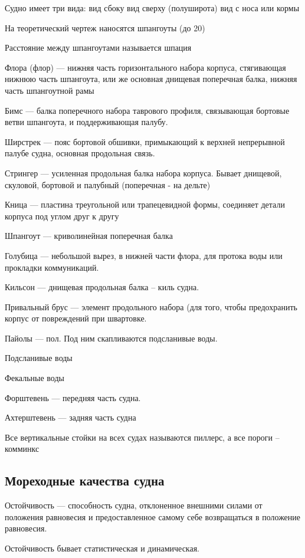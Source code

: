 \documentclass{article}        %
\begin{document}
\begin{description}
Судно имеет три вида:
вид сбоку
вид сверху (полуширота)
вид с носа или кормы

На теоретический чертеж наносятся шпангоуты
(до 20)

Расстояние между шпангоутами называется шпация


Флора (флор) --- нижняя часть горизонтального набора корпуса, 
	стягивающая нижнюю часть шпангоута, или же основная
	днищевая поперечная балка, нижняя часть шпангоутной рамы

Бимс --- балка поперечного набора таврового профиля, связывающая 
	бортовые ветви шпангоута, и поддерживающая палубу.


Ширстрек --- пояс бортовой обшивки, примыкающий к верхней непрерывной 
	палубе судна, основная продольная связь.

Стрингер --- усиленная продольная балка набора корпуса. Бывает
	днищевой, скуловой, бортовой и палубный (поперечная - на дельте)

Кница --- пластина треугольной или трапецевидной формы, соединяет детали корпуса под углом друг к другу

Шпангоут --- криволинейная поперечная балка

Голубица --- небольшой вырез, в нижней части флора, для протока воды или прокладки коммуникаций.

Кильсон --- днищевая продольная балка -- киль судна.

Привальный брус --- элемент продольного набора (для того, чтобы предохранить корпус от повреждений
	при швартовке. 

Пайолы --- пол. Под ним скапливаются подсланивые воды.

Подсланивые воды

Фекальные воды

Форштевень --- передняя часть судна.

Ахтерштевень --- задняя часть судна

Все вертикальные стойки на всех судах называются пиллерс, а все пороги -- комминкс




\subsection{Мореходные качества судна}
Остойчивость --- способность судна, отклоненное внешними силами от положения равновесия
	и предоставленное самому себе возвращаться в положение равновесия.

Остойчивость бывает статистическая и динамическая.


\end{description}
\end{document}
